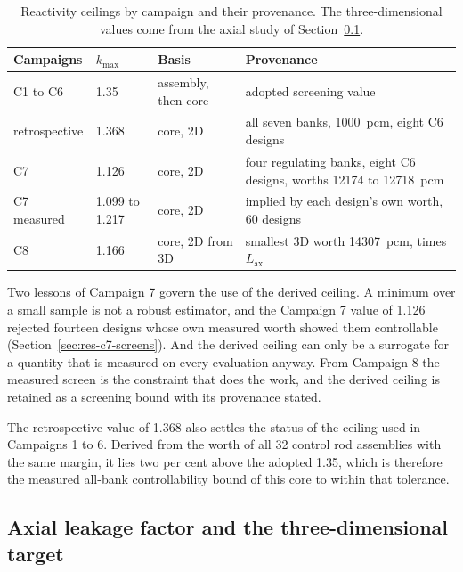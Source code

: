 \begin{table}[htbp]
  \centering
  \caption{Reactivity ceilings by campaign and their provenance. The
  three-dimensional values come from the axial study of
  Section~\ref{sec:meth-lax}.}
  \label{tab:ctrl-bounds}
  \begin{tabular}{llll}
    \toprule
    Campaigns & $k_{\max}$ & Basis & Provenance \\
    \midrule
    C1 to C6 & 1.35  & assembly, then core & adopted screening value \\
    retrospective & 1.368 & core, 2D & all seven banks, \SI{1000}{pcm}, eight C6 designs \\
    C7 & 1.126 & core, 2D & four regulating banks, eight C6 designs, worths \num{12174} to \SI{12718}{pcm} \\
    C7 measured & 1.099 to 1.217 & core, 2D & implied by each design's own worth, 60 designs \\
    C8 & 1.166 & core, 2D from 3D & smallest 3D worth \SI{14307}{pcm}, times $L_\mathrm{ax}$ \\
    \bottomrule
  \end{tabular}
\end{table}

Two lessons of Campaign 7 govern the use of the derived ceiling. A
minimum over a small sample is not a robust estimator, and the
Campaign 7 value of 1.126 rejected fourteen designs whose own measured
worth showed them controllable (Section~\ref{sec:res-c7-screens}).
And the derived ceiling can only be a surrogate for a quantity that is
measured on every evaluation anyway. From Campaign 8 the measured
screen is the constraint that does the work, and the derived ceiling
is retained as a screening bound with its provenance stated.

The retrospective value of 1.368 also settles the status of the
ceiling used in Campaigns 1 to 6. Derived from the worth of all 32
control rod assemblies with the same margin, it lies two per cent
above the adopted 1.35, which is therefore the measured all-bank
controllability bound of this core to within that tolerance.

\subsection{Axial leakage factor and the three-dimensional target}
\label{sec:meth-lax}


